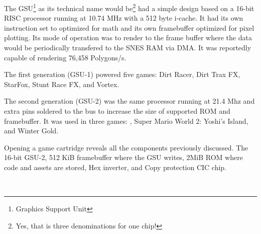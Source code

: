 \par
The GSU\footnote{Graphics Support Unit} as its technical name would be\footnote{Yes, that is three denominations for one chip!} had a simple design based on a 16-bit RISC processor running at 10.74 MHz with a 512 byte i-cache. It had its own instruction set to optimized for math and its own framebuffer optimized for pixel plotting. Its mode of operation was to render to the frame buffer where the data would be periodically transfered to the SNES RAM via DMA. It was reportedly capable of rendering 76,458 Polygons/s.\\

\par
The first generation (GSU-1) powered five games: Dirt Racer, Dirt Trax FX, StarFox, Stunt Race FX, and Vortex.\\
\par
 The second generation (GSU-2) was the same processor running at 21.4 Mhz and extra pins soldered to the bus to increase the size of supported ROM and framebuffer. It was used in three games: \doom{}, Super Mario World 2: Yoshi's Island, and Winter Gold.\\
\par
Opening a \doom{} game cartridge reveals all the components previously discussed.  The 16-bit GSU-2,  512 KiB framebuffer where the GSU writes,  2MiB ROM where code and assets are stored,  Hex inverter, and  Copy protection CIC chip.







\\
\par

\pagebreak


